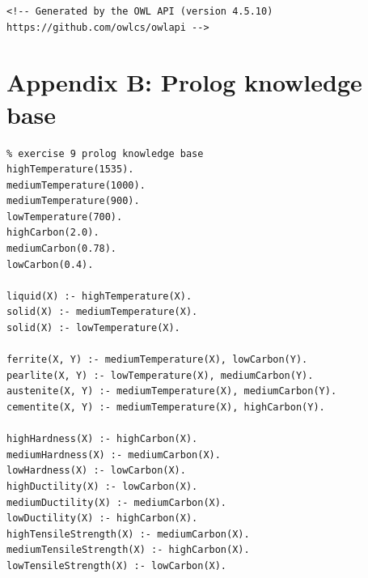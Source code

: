 \documentclass[12pt]{article}
\begin{document}
{\begin{lstlisting}
<!-- Generated by the OWL API (version 4.5.10) https://github.com/owlcs/owlapi -->	
\end{lstlisting}

\newpage
\section{Appendix B: Prolog knowledge base}
\label{sec: AppendixB}
\lstset{basicstyle=\normalsize}
\begin{lstlisting}
% exercise 9 prolog knowledge base
highTemperature(1535).
mediumTemperature(1000).
mediumTemperature(900).
lowTemperature(700).
highCarbon(2.0).
mediumCarbon(0.78).
lowCarbon(0.4).

liquid(X) :- highTemperature(X).
solid(X) :- mediumTemperature(X).
solid(X) :- lowTemperature(X).

ferrite(X, Y) :- mediumTemperature(X), lowCarbon(Y).
pearlite(X, Y) :- lowTemperature(X), mediumCarbon(Y).
austenite(X, Y) :- mediumTemperature(X), mediumCarbon(Y).
cementite(X, Y) :- mediumTemperature(X), highCarbon(Y).

highHardness(X) :- highCarbon(X).
mediumHardness(X) :- mediumCarbon(X).
lowHardness(X) :- lowCarbon(X).
highDuctility(X) :- lowCarbon(X).
mediumDuctility(X) :- mediumCarbon(X).
lowDuctility(X) :- highCarbon(X).
highTensileStrength(X) :- mediumCarbon(X).
mediumTensileStrength(X) :- highCarbon(X).
lowTensileStrength(X) :- lowCarbon(X).
\end{lstlisting}


}
\end{document}
